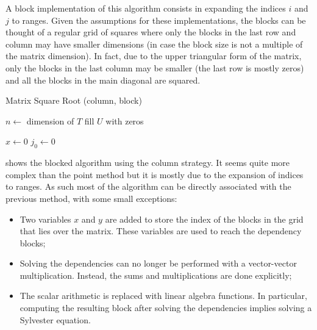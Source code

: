 \documentclass[../thesis]{subfiles}
\begin{document}
	A block implementation of this algorithm consists in expanding the indices $i$ and $j$ to ranges. Given the assumptions for these implementations, the blocks can be thought of a regular grid of squares where only the blocks in the last row and column may have smaller dimensions (in case the block size is not a multiple of the matrix dimension). In fact, due to the upper triangular form of the matrix, only the blocks in the last column may be smaller (the last row is mostly zeros) and all the blocks in the main diagonal are squared.

	\begin{algorithm}[htp]
		\caption{Matrix Square Root (column, block)}
		\label{alg:sqrtm:column:block}
		\DontPrintSemicolon


		$n \leftarrow$ dimension of $T$\;
		fill $U$ with zeros\;

		$x \leftarrow 0$\;
		$j_0 \leftarrow 0$\;
	\end{algorithm}

	 shows the blocked algorithm using the column strategy. It seems quite more complex than the point method but it is mostly due to the expansion of indices to ranges. As such most of the algorithm can be directly associated with the previous method, with some small exceptions:
	\begin{itemize}
		\item Two variables $x$ and $y$ are added to store the index of the blocks in the grid that lies over the matrix. These variables are used to reach the dependency blocks;
		\item Solving the dependencies can no longer be performed with a vector-vector multiplication. Instead, the sums and multiplications are done explicitly;
		\item The scalar arithmetic is replaced with linear algebra functions. In particular, computing the resulting block after solving the dependencies implies solving a Sylvester equation.
	\end{itemize}
\end{document}
